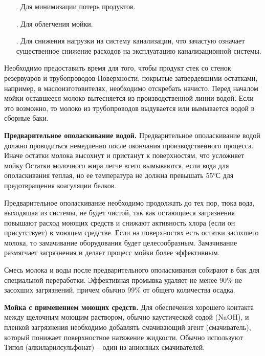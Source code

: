 {\begin{itemize}[leftmargin=2.15cm, labelwidth=0.65cm, labelsep=0.0cm]
	\item[\theitemcntr. ] Для минимизации потерь продуктов.
	\addtocounter{itemcntr}{1}
	
	\item[\theitemcntr. ] Для облегчения мойки.
	\addtocounter{itemcntr}{1}
	
	\item[\theitemcntr. ] Для снижения нагрузки на систему канализации, что зачастую означает существенное снижение расходов на эксплуатацию канализационной системы.
	\addtocounter{itemcntr}{1}
	
	\setcounter{itemcntr}{1}
\end{itemize} 

\par \redline Необходимо предоставить время для того, чтобы продукт стек со стенок резервуаров и трубопроводов Поверхности, покрытые затвердевшими остатками, например, в маслоизготовителях, необходимо отскребать начисто. Перед началом мойки оставшееся молоко вытесняется из производственной линии водой. Если это возможно, то молоко из трубопроводов выдувается или вымывается водой в сборные баки.


\par \redline \textbf{Предварительное ополаскивание водой.} Предварительное ополаскивание водой должно проводиться немедленно после окончания производственного процесса. Иначе остатки молока высохнут и пристанут к поверхностям, что усложняет мойку Остатки молочного жира легче всего вымываются, если вода для ополаскивания теплая, но ее температура не должна превышать 55°С для предотвращения коагуляции белков.

\par \redline Предварительное ополаскивание необходимо продолжать до тех пор, тюка вода, выходящая из системы, не будет чистой, так как остающиеся загрязнения повышают расход моющих средств и снижают активность хлора (если он присутствует) в моющем средстве. Если на поверхностях есть остатки засохшего молока, то замачивание оборудования будет целесообразным. Замачивание размягчает загрязнения и делает процесс мойки более эффективным.

\par \redline Смесь молока и воды после предварительного ополаскивания собирают в бак для специальной переработки. Эффективная промывка удаляет не менее 90\% не засохших загрязнений, причем обычно 99\% от общего количества осадка.

\par \redline \textbf{Мойка с применением моющих средств.} Для обеспечения хорошего контакта между щелочным моющим раствором, обычно каустической содой (NaOH), и пленкой загрязнения необходимо добавлять смачивающий агент (смачиватель), который понижает поверхностное натяжение жидкости. Обычно используют Типол (алкиларилсульфонат) {--} один из анионных смачивателей.

}
